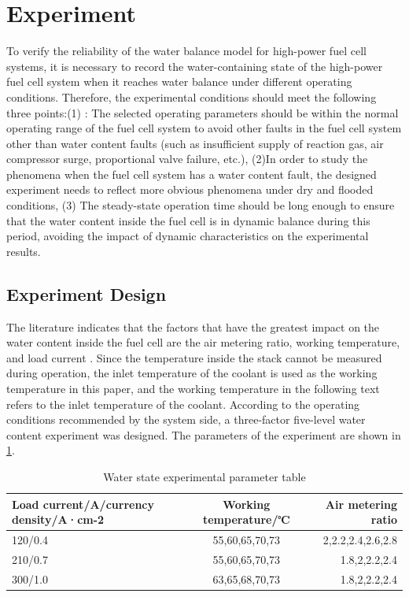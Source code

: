 \section{Experiment}
To verify the reliability of the water balance model for high-power fuel cell systems, it is necessary to record the water-containing state of the high-power fuel cell system when it reaches water balance under different operating conditions. Therefore, the experimental conditions should meet the following three points:(1) : The selected operating parameters should be within the normal operating range of the fuel cell system to avoid other faults in the fuel cell system other than water content faults (such as insufficient supply of reaction gas, air compressor surge, proportional valve failure, etc.), (2)In order to study the phenomena when the fuel cell system has a water content fault, the designed experiment needs to reflect more obvious phenomena under dry and flooded conditions, (3) The steady-state operation time should be long enough to ensure that the water content inside the fuel cell is in dynamic balance during this period, avoiding the impact of dynamic characteristics on the experimental results.
\subsection{Experiment Design}
The literature indicates that the factors that have the greatest impact on the water content inside the fuel cell are the air metering ratio, working temperature, and load current \cite{legrosFirstResultsPEMFC2011}. Since the temperature inside the stack cannot be measured during operation, the inlet temperature of the coolant is used as the working temperature in this paper, and the working temperature in the following text refers to the inlet temperature of the coolant. According to the operating conditions recommended by the system side, a three-factor five-level water content experiment was designed. The parameters of the experiment are shown in \ref{tab:WaterStateExperimentalParameterTable}.
\begin{table}
    \centering
    \begin{center}
    \caption{Water state experimental parameter table}
    \label{tab:WaterStateExperimentalParameterTable}
    \begin{tabular}{l|c|r}
        \hline
        \textbf{Load current/A/currency density/A·cm-2} & \textbf{Working temperature/℃} & \textbf{Air metering ratio}\\
        \hline
        120/0.4 & 55,60,65,70,73 & 2,2.2,2.4,2.6,2.8\\
        210/0.7 & 55,60,65,70,73 & 1.8,2,2.2,2.4 \\
        300/1.0 & 63,65,68,70,73 & 1.8,2,2.2,2.4 \\
        \hline
        
    \end{tabular}
\end{center}
\end{table}

